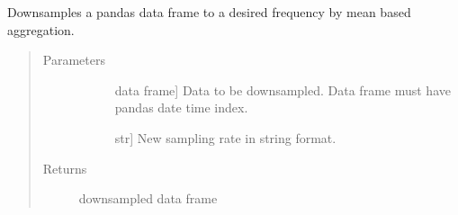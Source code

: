 \documentclass[letterpaper,10pt,english]{sphinxmanual}
\begin{document}
\begin{fulllineitems}
\label{\detokenize{index:sleeppy.utils.downsample_by_mean}}
Downsamples a pandas data frame to a desired frequency by mean based aggregation.
\begin{quote}\begin{description}
\item[{Parameters}] \leavevmode\begin{description}
\item[{}] \leavevmode{[}data frame{]}
Data to be downsampled. Data frame must have pandas date time index.

\item[{}] \leavevmode{[}str{]}
New sampling rate in string format.

\end{description}

\item[{Returns}] \leavevmode\begin{description}
\item[{downsampled data frame}] \leavevmode
\end{description}

\end{description}\end{quote}

\end{fulllineitems}

\end{document}
